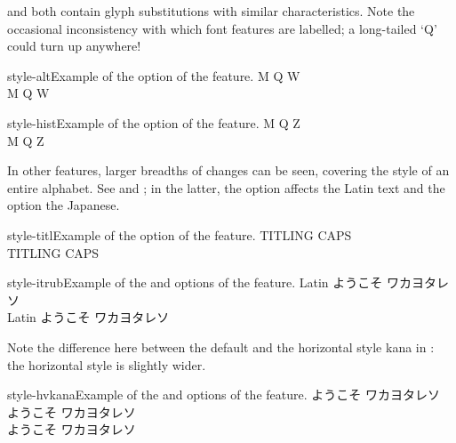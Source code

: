 \documentclass[a4paper]{l3doc}
\begin{document}
 and  both contain glyph
substitutions with similar characteristics.
Note the occasional inconsistency with which font features are labelled; a long-tailed `Q' could turn up anywhere!

 \begin{Xexample}[firstline=2]{style-alt}{Example of the  option of the  feature.}
  \Large
   M Q W                      \\
   M Q W
\end{Xexample}

\begin{Xexample}[firstline=2]{style-hist}{Example of the  option of the  feature.}
  \Large
   M Q Z                      \\
   M Q Z
\end{Xexample}

In other features, larger breadths of changes can be seen, covering
the style of an entire alphabet. See  and ; in the latter, the  option affects the Latin text and the  option the Japanese.

\begin{Xexample}[firstline=2]{style-titl}{Example of the  option of the  feature.}
  \Large
   TITLING CAPS                       \\
   TITLING CAPS
\end{Xexample}

\begin{Xexample}[firstline=2]{style-itrub}{Example of the  and  options of the  feature.}
  \Large \def\kana{ようこそ ワカヨタレソ}
   Latin \kana        \\
   Latin \kana
\end{Xexample}

Note the difference here between the default and the horizontal style kana
in : the horizontal style is slightly wider.

\begin{Xexample}[firstline=2]{style-hvkana}{Example of the  and  options of the  feature.}
  \Large \def\kana{ようこそ ワカヨタレソ}
    \kana   \\
  {
    \kana } \\
  {
    \kana }
\end{Xexample}
\end{document}
